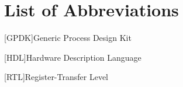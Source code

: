 \section*{List of Abbreviations}
\begin{acronym}
		
	[GPDK]{Generic Process Design Kit}
		
	[HDL]{Hardware Description Language}
		
	[RTL]{Register-Transfer Level}
\end{acronym}


